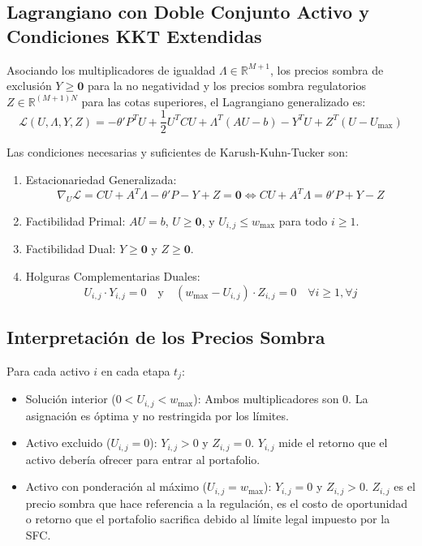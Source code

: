 \documentclass[11pt,a4paper]{article}
\begin{document}
\subsection{Lagrangiano con Doble Conjunto Activo y Condiciones KKT Extendidas}
Asociando los multiplicadores de igualdad $\Lambda \in \mathbb{R}^{M+1}$, los precios sombra de exclusión $Y \ge \mathbf{0}$ para la no negatividad y los precios sombra regulatorios $Z \in \mathbb{R}^{(M+1)N}$ para las cotas superiores, el Lagrangiano generalizado es:
\begin{equation}
    \mathcal{L}(U, \Lambda, Y, Z) = -\theta' P^T U + \frac{1}{2} U^T C U + \Lambda^T (AU - b) - Y^T U + Z^T (U - U_{\max})
\end{equation}

Las condiciones necesarias y suficientes de Karush-Kuhn-Tucker son:
\begin{enumerate}
    \item Estacionariedad Generalizada:
    \begin{equation}
        \nabla_U \mathcal{L} = CU + A^T \Lambda - \theta' P - Y + Z = \mathbf{0} \iff CU + A^T \Lambda = \theta' P + Y - Z
    \end{equation}
    \item Factibilidad Primal: $AU = b$, $U \ge \mathbf{0}$, y $U_{i,j} \le w_{\max}$ para todo $i \ge 1$.
    \item Factibilidad Dual: $Y \ge \mathbf{0}$ y $Z \ge \mathbf{0}$.
    \item Holguras Complementarias Duales:
    \begin{equation}
        U_{i,j} \cdot Y_{i,j} = 0 \quad \text{y} \quad (w_{\max} - U_{i,j}) \cdot Z_{i,j} = 0 \quad \forall i \ge 1, \forall j
    \end{equation}
\end{enumerate}

\subsection{Interpretación de los Precios Sombra}
Para cada activo $i$ en cada etapa $t_j$:
\begin{itemize}
    \item Solución interior ($0 < U_{i,j} < w_{\max}$): Ambos multiplicadores son 0. La asignación es óptima y no restringida por los límites.
    \item Activo excluido ($U_{i,j} = 0$): $Y_{i,j} > 0$ y $Z_{i,j} = 0$. $Y_{i,j}$ mide el retorno que el activo debería ofrecer para entrar al portafolio.
    \item Activo con ponderación al máximo ($U_{i,j} = w_{\max}$): $Y_{i,j} = 0$ y $Z_{i,j} > 0$. $Z_{i,j}$ es el precio sombra que hace referencia a la regulación, es el costo de oportunidad o retorno que el portafolio sacrifica debido al límite legal impuesto por la SFC.
\end{itemize}
\end{document}
